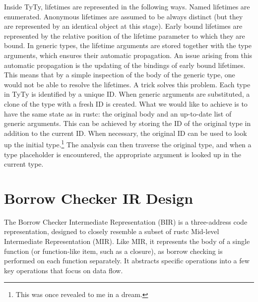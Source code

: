 \documentclass[
  11pt,
  twoside,symmetric]{report}
\begin{document}
Inside TyTy, lifetimes are represented in the following ways. Named
lifetimes are enumerated. Anonymous lifetimes are assumed to be always
distinct (but they are represented by an identical object at this
stage). Early bound lifetimes are represented by the relative position
of the lifetime parameter to which they are bound. In generic types, the
lifetime arguments are stored together with the type arguments, which
ensures their automatic propagation. An issue arising from this
automatic propagation is the updating of the bindings of early bound
lifetimes. This means that by a simple inspection of the body of the
generic type, one would not be able to resolve the lifetimes. A trick
solves this problem. Each type in TyTy is identified by a unique ID.
When generic arguments are substituted, a clone of the type with a fresh
ID is created. What we would like to achieve is to have the same state
as in rustc: the original body and an up-to-date list of generic
arguments. This can be achieved by storing the ID of the original type
in addition to the current ID. When necessary, the original ID can be
used to look up the initial type.\footnote{This was once revealed to me
  in a dream.} The analysis can then traverse the original type, and
when a type placeholder is encountered, the appropriate argument is
looked up in the current type.

\section{Borrow Checker IR Design}\label{sec:borrow-checker-ir-design}

The Borrow Checker Intermediate Representation (BIR) is a three-address
code representation, designed to closely resemble a subset of rustc
Mid-level Intermediate Representation (MIR). Like MIR, it represents the
body of a single function (or function-like item, such as a closure), as
borrow checking is performed on each function separately. It abstracts
specific operations into a few key operations that focus on data flow.
\end{document}

